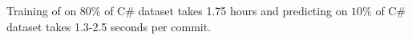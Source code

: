 

Training of \tool on $80\%$ of C\# dataset takes 1.75 hours and
predicting on $10\%$ of C\# dataset takes 1.3-2.5 seconds per commit.
